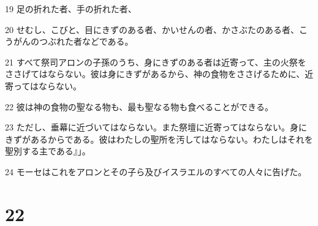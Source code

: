 \par 19 足の折れた者、手の折れた者、
\par 20 せむし、こびと、目にきずのある者、かいせんの者、かさぶたのある者、こうがんのつぶれた者などである。
\par 21 すべて祭司アロンの子孫のうち、身にきずのある者は近寄って、主の火祭をささげてはならない。彼は身にきずがあるから、神の食物をささげるために、近寄ってはならない。
\par 22 彼は神の食物の聖なる物も、最も聖なる物も食べることができる。
\par 23 ただし、垂幕に近づいてはならない。また祭壇に近寄ってはならない。身にきずがあるからである。彼はわたしの聖所を汚してはならない。わたしはそれを聖別する主である』」。
\par 24 モーセはこれをアロンとその子ら及びイスラエルのすべての人々に告げた。

\chapter{22}

